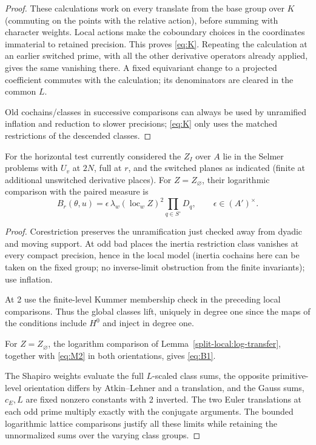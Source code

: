 \begin{proof}
These calculations work on every translate from the base group over \(K\) (commuting on the points with the relative action), before summing with character weights. Local actions make the coboundary choices in the coordinates immaterial to retained precision. This proves \eqref{eq:K}. Repeating the calculation at an earlier switched prime, with all the other derivative operators already applied, gives the same vanishing there. A fixed equivariant change to a projected coefficient commutes with the calculation; its denominators are cleared in the common \(L\).

Old cochains/classes in successive comparisons can always be used by unramified inflation and reduction to slower precisions; \eqref{eq:K} only uses the matched restrictions of the descended classes.
\end{proof}

\begin{corollary}\label{split-local:point-measure}
For the horizontal test currently considered the \(Z_I\) over \(A\) lie in the Selmer problems with \(U_v\) at \(2N\), full at \(r\), and the switched planes as indicated (finite at additional unswitched derivative places). For \(Z=Z_\varnothing\), their logarithmic comparison with the paired measure is
\[
 B_r(\theta,u)=\epsilon\,
 \lambda_w(\operatorname{loc}_wZ)^2\prod_{q\in S^\circ}D_q,
 \qquad \epsilon\in(A')^\times.\tag{B1}\label{eq:B1}
\]
\end{corollary}

\begin{proof}
Corestriction preserves the unramification just checked away from dyadic and moving support. At odd bad places the inertia restriction class vanishes at every compact precision, hence in the local model (inertia cochains here can be taken on the fixed group; no inverse-limit obstruction from the finite invariants); use inflation.

At 2 use the finite-level Kummer membership check in the preceding local comparisons. Thus the global classes lift, uniquely in degree one since the maps of the conditions include \(H^0\) and inject in degree one.

For \(Z=Z_\varnothing\), the logarithm comparison of Lemma~\ref{split-local:log-transfer}, together with \eqref{eq:M2} in both orientations, gives \eqref{eq:B1}.

The Shapiro weights evaluate the full \(L\)-scaled class sums, the opposite primitive-level orientation differs by Atkin--Lehner and a translation, and the Gauss sums, \(c_E,L\) are fixed nonzero constants with 2 inverted. The two Euler translations at each odd prime multiply exactly with the conjugate arguments. The bounded logarithmic lattice comparisons justify all these limits while retaining the unnormalized sums over the varying class groups.
\end{proof}


